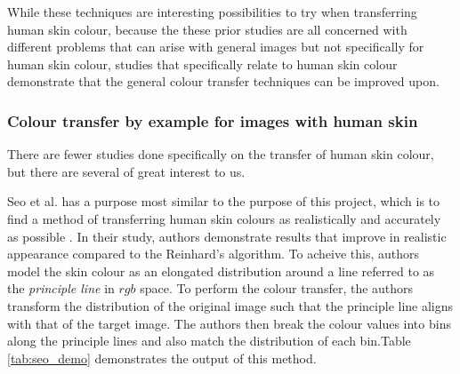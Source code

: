 While these techniques are interesting possibilities to try when transferring human skin colour, because the these prior studies are all concerned with different problems that can arise with general images but not specifically for human skin colour, studies that specifically relate to human skin colour demonstrate that the general colour transfer techniques can be improved upon.

\subsubsection{Colour transfer by example for images with human skin}
There are fewer studies done specifically on the transfer of human skin colour, but there are several of great interest to us.

Seo et al. has a purpose most similar to the purpose of this project, which is to find a method of transferring human skin colours as realistically and accurately as possible \cite{seo_2005_transfer}. In their study, authors demonstrate results that improve in realistic appearance compared to the Reinhard's algorithm. To acheive this, authors model the skin colour as an elongated distribution around a line referred to as the \textit{principle line} in $rgb$ space. To perform the colour transfer, the authors transform the distribution of the original image such that the principle line aligns with that of the target image. The authors then break the colour values into bins along the principle lines and also match the distribution of each bin.Table \ref{tab:seo_demo} demonstrates the output of this method.

